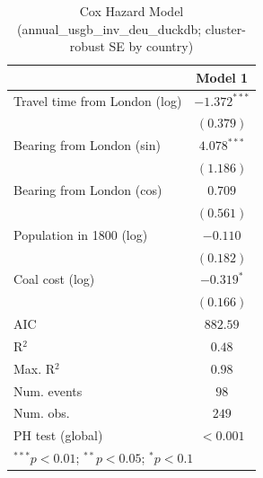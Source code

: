 
\begin{table}
\begin{center}
\begin{tabular}{l c}
\hline
 & Model 1 \\
\hline
Travel time from London (log) & $-1.372^{***}$ \\
 & $(0.379)$ \\
Bearing from London (sin) & $4.078^{***}$ \\
 & $(1.186)$ \\
Bearing from London (cos) & $0.709$ \\
 & $(0.561)$ \\
Population in 1800 (log) & $-0.110$ \\
 & $(0.182)$ \\
Coal cost (log) & $-0.319^{*}$ \\
 & $(0.166)$ \\
\hline
AIC              & $882.59$ \\
R$^2$            & $0.48$ \\
Max. R$^2$       & $0.98$ \\
Num. events      & $98$ \\
Num. obs.        & $249$ \\
PH test (global) & $<0.001$ \\
\hline
\multicolumn{2}{l}{\scriptsize{$^{***}p<0.01$; $^{**}p<0.05$; $^{*}p<0.1$}}
\end{tabular}
\caption{Cox Hazard Model (annual\_usgb\_inv\_deu\_duckdb; cluster-robust SE by country)}
\label{tab:cox_serious_annual_usgb_inv_deu_duckdb}
\end{center}
\end{table}
